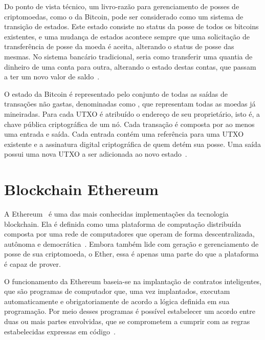 Do ponto de vista técnico, um livro-razão para gerenciamento de posses de criptomoedas, como o da Bitcoin, pode ser considerado como um sistema de transição de estados. Este estado consiste no status da posse de todos os bitcoins existentes, e uma mudança de estados acontece sempre que uma solicitação de transferência de posse da moeda é aceita, alterando o status de posse das mesmas. No sistema bancário tradicional, seria como transferir uma quantia de dinheiro de uma conta para outra, alterando o estado destas contas, que passam a ter um novo valor de saldo~\cite{ethereum2014whitepaper}.

O estado da Bitcoin é representado pelo conjunto de todas as saídas de transações não gastas, denominadas como , que representam todas as moedas já mineiradas. Para cada UTXO é atribuído o endereço de seu proprietário, isto é, a chave pública criptográfica de um nó. Cada transação é composta por ao menos uma entrada e saída. Cada entrada contém uma referência para uma UTXO existente e a assinatura digital criptográfica de quem detém sua posse. Uma saída possui uma nova UTXO a ser adicionada ao novo estado~\cite{ethereum2014whitepaper}. 


\section{Blockchain Ethereum} \label{tex:fund:ethereum}

A Ethereum~\cite{ethereum2014whitepaper} é uma das mais conhecidas implementações da tecnologia blockchain. Ela é definida como uma plataforma de computação distribuída composta por uma rede de computadores que operam de forma descentralizada, autônoma e democrática~\cite{wood2014ethereum-yellow-paper}. Embora também lide com geração e gerenciamento de posse de sua criptomoeda, o Ether, essa é apenas uma parte do que a plataforma é capaz de prover.

O funcionamento da Ethereum baseia-se na implantação de contratos inteligentes, que são programas de computador que, uma vez implantados, executam automaticamente e obrigatoriamente  de acordo a lógica definida em sua programação. Por meio desses programas é possível estabelecer um acordo entre duas ou mais partes envolvidas, que se comprometem a cumprir com as regras estabelecidas expressas em código~\cite{overview-chen2020blockchain-graph}.

